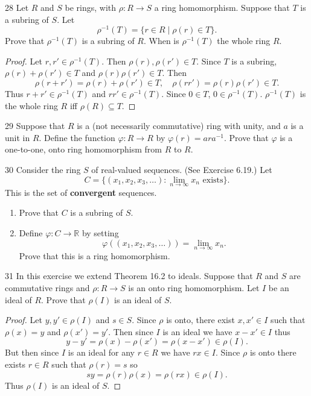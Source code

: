 \begin{problem}{28}
    Let $R$ and $S$ be rings, with $\rho: R \longrightarrow S$ 
    a ring homomorphism. Suppose that $T$ is a subring of $S$.
    Let 
    \[\rho^{-1}(T) = \{r \in R \mid \rho(r) \in T\}.\]
    Prove that $\rho^{-1}(T)$ is a subring of $R$.
    When is $\rho^{-1}(T)$ the whole ring $R$.
\end{problem}
\solved

\begin{proof}
    Let $r, r' \in \rho^{-1}(T)$.  
    Then $\rho(r), \rho(r') \in T$.  
    Since $T$ is a subring, $\rho(r) + \rho(r') \in T$ and $\rho(r)\rho(r') \in T$.  
    Then
    \[
        \rho(r + r') = \rho(r) + \rho(r') \in T, \quad 
        \rho(rr') = \rho(r)\rho(r') \in T.
    \]
    Thus $r + r' \in \rho^{-1}(T)$ and $rr' \in \rho^{-1}(T)$.  
    Since $0 \in T$, $0 \in \rho^{-1}(T)$.  
    $\rho^{-1}(T)$ is the whole ring $R$ iff $\rho(R) \subseteq T$.
\end{proof}

\begin{problem}{29}
    Suppose that $R$ is a (not necessarily commutative) ring with unity, and $a$ is a
    unit in $R$. Define the function $\varphi : R \to R$ by $\varphi(r) = ara^{-1}$.
    Prove that $\varphi$ is a one-to-one, onto ring homomorphism from $R$ to $R$.
\end{problem}
\unsolved

\begin{problem}{30}
    Consider the ring $S$ of real-valued sequences. (See Exercise 6.19.) Let
    \[C = \{(x_1, x_2, x_3, \ldots) : \lim_{n \to \infty} x_n \text{ exists}\}.\]
    This is the set of \textbf{convergent} sequences.
    \begin{enumerate}
        \item[(a)] Prove that $C$ is a subring of $S$.
        \item[(b)] Define $\varphi : C \to \mathbb{R}$ by setting
        \[\varphi((x_1, x_2, x_3, \ldots)) = \lim_{n \to \infty} x_n.\]
        Prove that this is a ring homomorphism.
    \end{enumerate}
\end{problem}
\unsolved

\begin{problem}{31}
    In this exercise we extend Theorem 16.2 to ideals.
    Suppose that $R$ and $S$ are commutative rings and $\rho : R \longrightarrow S$
    is an onto ring homomorphism. Let $I$ be an ideal of $R$. Prove that $\rho(I)$ is an ideal of $S$.
\end{problem}
\solved

\begin{proof}
    Let $y, y' \in \rho(I)$ and $s \in S$.  
    Since $\rho$ is onto, there exist $x, x' \in I$ such that $\rho(x) = y$ and $\rho(x') = y'$.  
    Then since $I$ is an ideal we have $x - x' \in I$ thus
    \[
        y - y' = \rho(x) - \rho(x') = \rho(x - x') \in \rho(I).
    \]
    But then since $I$ is an ideal for any $r \in R$ we have $r x \in I$.  
    Since $\rho$ is onto there exists $r \in R$ such that $\rho(r) = s$ so
    \[
        s y = \rho(r) \rho(x) = \rho(r x) \in \rho(I).
    \]
    Thus $\rho(I)$ is an ideal of $S$.
\end{proof}
